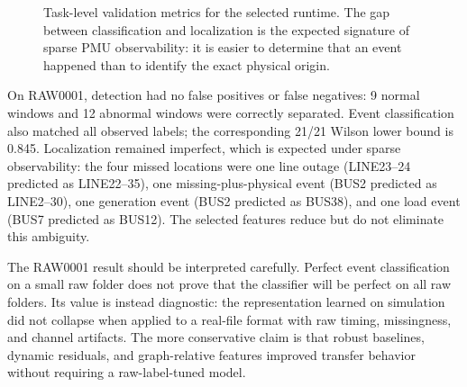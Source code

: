 \documentclass[conference]{IEEEtran}
\begin{document}
\begin{figure}[t]
\centering
{}
\caption{Task-level validation metrics for the selected runtime. The gap between classification and localization is the expected signature of sparse PMU observability: it is easier to determine that an event happened than to identify the exact physical origin.}
\label{fig:metriclines}
\end{figure}

On RAW0001, detection had no false positives or false negatives: 9 normal windows and 12 abnormal windows were correctly separated. Event classification also matched all observed labels; the corresponding 21/21 Wilson lower bound is 0.845. Localization remained imperfect, which is expected under sparse observability: the four missed locations were one line outage (LINE23--24 predicted as LINE22--35), one missing-plus-physical event (BUS2 predicted as LINE2--30), one generation event (BUS2 predicted as BUS38), and one load event (BUS7 predicted as BUS12). The selected features reduce but do not eliminate this ambiguity.

The RAW0001 result should be interpreted carefully. Perfect event classification on a small raw folder does not prove that the classifier will be perfect on all raw folders. Its value is instead diagnostic: the representation learned on simulation did not collapse when applied to a real-file format with raw timing, missingness, and channel artifacts. The more conservative claim is that robust baselines, dynamic residuals, and graph-relative features improved transfer behavior without requiring a raw-label-tuned model.
\end{document}
